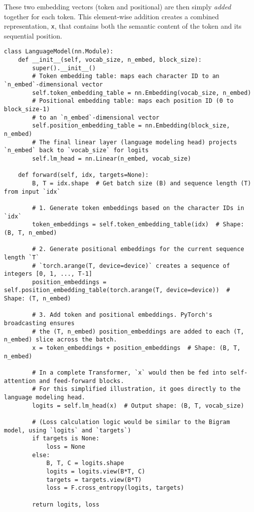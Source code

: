 These two embedding vectors (token and positional) are then simply \textit{added} together for each token. This element-wise addition creates a combined representation, \texttt{x}, that contains both the semantic content of the token and its sequential position.

\begin{lstlisting}[caption={Token and Positional Embeddings in the LanguageModel}]
class LanguageModel(nn.Module):
    def __init__(self, vocab_size, n_embed, block_size):
        super().__init__()
        # Token embedding table: maps each character ID to an `n_embed`-dimensional vector
        self.token_embedding_table = nn.Embedding(vocab_size, n_embed)
        # Positional embedding table: maps each position ID (0 to block_size-1)
        # to an `n_embed`-dimensional vector
        self.position_embedding_table = nn.Embedding(block_size, n_embed)
        # The final linear layer (language modeling head) projects `n_embed` back to `vocab_size` for logits
        self.lm_head = nn.Linear(n_embed, vocab_size) 

    def forward(self, idx, targets=None):
        B, T = idx.shape  # Get batch size (B) and sequence length (T) from input `idx`

        # 1. Generate token embeddings based on the character IDs in `idx`
        token_embeddings = self.token_embedding_table(idx)  # Shape: (B, T, n_embed)
        
        # 2. Generate positional embeddings for the current sequence length `T`
        # `torch.arange(T, device=device)` creates a sequence of integers [0, 1, ..., T-1]
        position_embeddings = self.position_embedding_table(torch.arange(T, device=device))  # Shape: (T, n_embed)
        
        # 3. Add token and positional embeddings. PyTorch's broadcasting ensures
        # the (T, n_embed) position_embeddings are added to each (T, n_embed) slice across the batch.
        x = token_embeddings + position_embeddings  # Shape: (B, T, n_embed)
        
        # In a complete Transformer, `x` would then be fed into self-attention and feed-forward blocks.
        # For this simplified illustration, it goes directly to the language modeling head.
        logits = self.lm_head(x)  # Output shape: (B, T, vocab_size)
        
        # (Loss calculation logic would be similar to the Bigram model, using `logits` and `targets`)
        if targets is None:
            loss = None
        else:
            B, T, C = logits.shape
            logits = logits.view(B*T, C)
            targets = targets.view(B*T)
            loss = F.cross_entropy(logits, targets)

        return logits, loss
\end{lstlisting}

